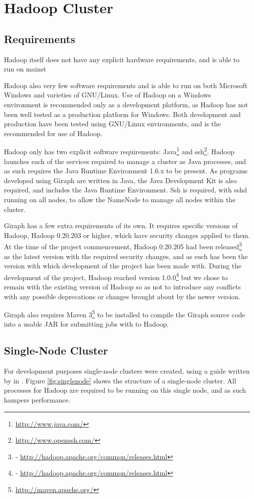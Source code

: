 \section{Hadoop Cluster}
\subsection{Requirements}
Hadoop itself does not have any explicit hardware requirements, and is able to run on mainst

Hadoop also very few software requirements and is able to run on both Microsoft Windows and varieties of GNU/Linux. Use of Hadoop on a Windows environment is recommended only as a development platform, as Hadoop has not been well tested as a production platform for Windows. Both development and production have been tested using GNU/Linux environments, and is the recommended for use of Hadoop.

Hadoop only has two explicit software requirements: Java\footnote{\url{http://www.java.com/}} and ssh\footnote{\url{http://www.openssh.com/}}. Hadoop launches each of the services required to manage a cluster as Java processes, and as such requires the Java Runtime Environment 1.6.x to be present. As programs developed using Giraph are written in Java, the Java Development Kit is also required, and includes the Java Runtime Environment. Ssh is required, with sshd running on all nodes, to allow the NameNode to manage all nodes within the cluster. 

Giraph has a few extra requirements of its own. It requires specific versions of Hadoop, Hadoop 0.20.203 or higher, which have security changes applied to them. At the time of the project commencement, Hadoop 0.20.205 had been released\footnote{\date{17th October 2011} - \url{http://hadoop.apache.org/common/releases.html}} as the latest version with the required security changes, and as such has been the version with which development of the project has been made with. During the development of the project, Hadoop reached version 1.0.0\footnote{\date{27th December 2011} - \url{http://hadoop.apache.org/common/releases.html}} but we chose to remain with the existing version of Hadoop so as not to introduce any conflicts with any possible deprecations or changes brought about by the newer version.

Giraph also requires Maven 3\footnote{\url{http://maven.apache.org/}} to be installed to compile the Giraph source code into a usable JAR for submitting jobs with to Hadoop.

\subsection{Single-Node Cluster}
For development purposes single-node clusters were created, using a guide written by \citeauthor{nollsingle} in \cite{nollsingle}. Figure \ref{fig:singlenode} shows the structure of a single-node cluster. All processes for Hadoop are required to be running on this single node, and as such hampers performance.

